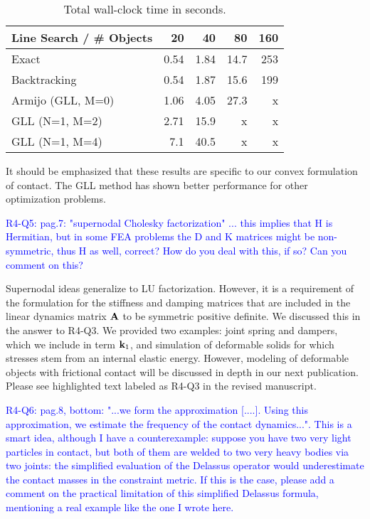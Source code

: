 \begin{table}[h!]
    \centering
\begin{tabular}{|l||r|r|r|r|}
    \hline
    Line Search / \# Objects & 20   & 40   & 80 & 160 \\
    \hline
    Exact                 & 0.54 & 1.84 & 14.7                  & 253 \\
    Backtracking          & 0.54 & 1.87 & 15.6                  & 199 \\
    Armijo (GLL, M=0)     & 1.06 & 4.05 & 27.3                  & x                       \\
    GLL (N=1, M=2)        & 2.71 & 15.9 & x & x                       \\
    GLL (N=1, M=4)        & 7.1  & 40.5 & x & x \\
    \hline
\end{tabular}
\caption{Total wall-clock time in seconds.}
\label{tab:gll_test}
\end{table}

It should be emphasized that these results are specific to our convex
formulation of contact. The GLL method has shown better performance for other
optimization problems.

\vspace{5mm}

\textcolor{blue}{R4-Q5: pag.7: "supernodal Cholesky factorization" ... this
implies that H is Hermitian, but in some FEA problems the D and K matrices might
be non-symmetric, thus H as well, correct? How do you deal with this, if so? Can
you comment on this? }

Supernodal ideas generalize to LU factorization. However, it is a requirement of
the formulation for the stiffness and damping matrices that are included in the
linear dynamics matrix ${\mathbf{A}}$ to be symmetric positive definite. We discussed
this in the answer to R4-Q3. We provided two examples: joint spring and dampers,
which we include in term ${\mathbf{k}}_1$, and simulation of deformable solids for
which stresses stem from an internal elastic energy. However, modeling
of deformable objects with frictional contact will be discussed in depth in our
next publication. Please see highlighted text labeled as R4-Q3 in the revised
manuscript.

\vspace{5mm}

\textcolor{blue}{R4-Q6: pag.8, bottom: "...we form the approximation [....].
Using this approximation, we estimate the frequency of the contact dynamics...".
This is a smart idea, although I have a counterexample: suppose you have two
very light particles in contact, but both of them are welded to two very heavy
bodies via two joints: the simplified evaluation of the Delassus operator would
underestimate the contact masses in the constraint metric. If this is the case,
please add a comment on the practical limitation of this simplified Delassus
formula, mentioning a real example like the one I wrote here.}

